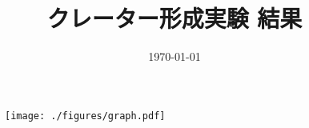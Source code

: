 \documentclass[a4paper]{ltjsarticle}
\begin{document}
\title{クレーター形成実験 結果}
\date{\today}
\maketitle
\thispagestyle{empty}
\begin{figure}[H]
    \centering
    \texttt{[image: ./figures/graph.pdf]}
\end{figure}
\end{document}
